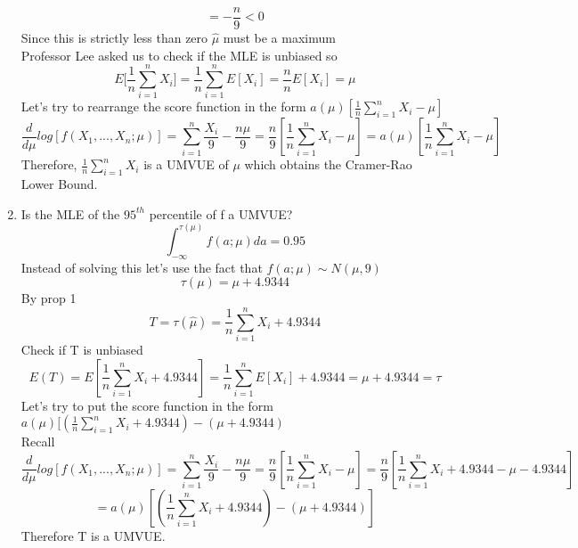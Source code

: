 \documentclass[a4paper]{article}
\begin{document}
\begin{enumerate}[label=(\alph*)]
\[	= -\frac{n}{9} <0
	\]
	Since this is strictly less than zero $\hat{\mu}$ must be a maximum
	\\Professor Lee asked us to check if the MLE is unbiased so
	\[ 
	E\Big[ \frac{1}{n}\sum_{i=1}^{n}X_i \Big] = 
	\frac{1}{n}\sum_{i=1}^{n}E[X_i]
	= \frac{n}{n}E[X_i] = \mu
	\]
	Let's try to rearrange the score function in the form $a(\mu)[\frac{1}{n}\sum_{i=1}^{n}X_i - \mu]$
	\[
	\frac{d}{d \mu} log[f(X_1,...,X_n;\mu)] = \sum_{i=1}^{n}\frac{X_i}{9} - \frac{n\mu}{9}
	=\frac{n}{9}[\frac{1}{n}\sum_{i=1}^{n}X_i - \mu]
	= a(\mu)[\frac{1}{n}\sum_{i=1}^{n}X_i - \mu]
	\]
	Therefore, $\frac{1}{n}\sum_{i=1}^{n}X_i$ is a UMVUE of $\mu$ which obtains the Cramer-Rao Lower Bound.
	\item  Is the MLE of the $95^{th}$ percentile of f a UMVUE?
	\[ 
	\int_{-\infty}^{\tau(\mu)}f(a;\mu)da = 0.95
	\]
	Instead of solving this let's use the fact that $f(a;\mu) \sim N(\mu,9)$
	\[ \tau(\mu) = \mu + 4.9344
	\]
	By prop 1 
	\[ T = \tau(\hat{\mu}) = \frac{1}{n}\sum_{i=1}^{n}X_i + 4.9344
	\]
	Check if T is unbiased
	\[
	E(T) = E[\frac{1}{n}\sum_{i=1}^{n}X_i + 4.9344] = \frac{1}{n}\sum_{i=1}^{n}E[X_i] + 4.9344
	= \mu +4.9344 = \tau
	\]
	Let's try to put the score function in the form $a(\mu)[(\frac{1}{n}\sum_{i=1}^{n}X_i + 4.9344) - (\mu + 4.9344)$
	\\Recall
	\[
	\frac{d}{d \mu} log[f(X_1,...,X_n;\mu)] = \sum_{i=1}^{n}\frac{X_i}{9} - \frac{n\mu}{9}
	=\frac{n}{9}[\frac{1}{n}\sum_{i=1}^{n}X_i - \mu]
	=\frac{n}{9}[\frac{1}{n}\sum_{i=1}^{n}X_i +4.9344 - \mu -4.9344]\]\[
	= a(\mu)[(\frac{1}{n}\sum_{i=1}^{n}X_i +4.9344) - (\mu +4.9344)]
	\]
	Therefore T is a UMVUE.
	\end{enumerate}
\end{document}

